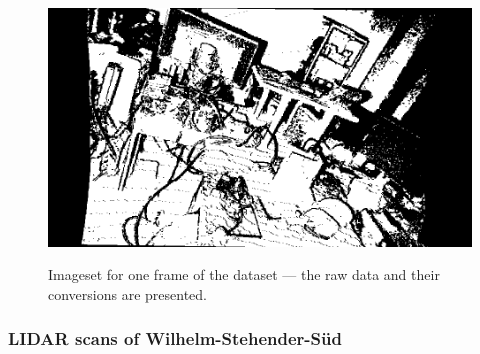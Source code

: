 \begin{figure}[H]
\begin{floatrow}
{    \includegraphics[width=0.5\linewidth]{chapter05/img/office/bearing_0024.png}%
    }
    {\caption{Imageset for one frame of the dataset --- the raw data and their conversions are presented.}\label{fig:office_data}}
\end{floatrow}
\end{figure}

\subsubsection{\acrshort{LIDAR} scans of Wilhelm-Stehender-Süd}

